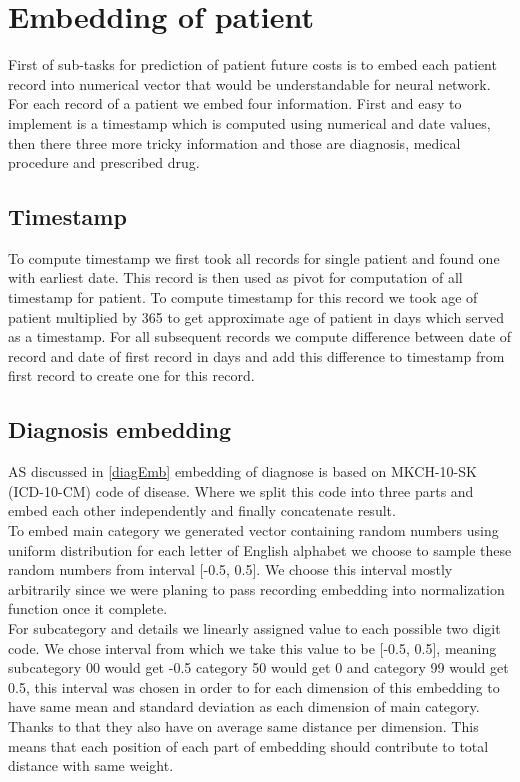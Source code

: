 
\section{Embedding of patient}
\label{embeddingImple}

First of sub-tasks for prediction of patient future costs is to embed each patient record into numerical vector that would be understandable for neural network. For each record of a patient we embed four information. First and easy to implement is a timestamp which is computed using numerical and date values, then there three more tricky information and those are diagnosis, medical procedure and prescribed drug. 

\subsection{Timestamp}

To compute timestamp we first took all records for single patient and found one with earliest date. This record is then used as pivot for computation of all timestamp for patient. To compute timestamp for this record we took age of patient multiplied by 365 to get approximate age of patient in days which served as a timestamp. For all subsequent records we compute difference between date of record and date of first record in days and add this difference to timestamp from first record to create one for this record.

\subsection{Diagnosis embedding}

AS discussed in \ref{diagEmb} embedding of diagnose is based on MKCH-10-SK (ICD-10-CM) code of disease. Where we split this code into three parts and embed each other independently and finally concatenate result.
\\

To embed main category we generated vector containing random numbers using uniform distribution for each letter of English alphabet we choose to sample these random numbers from interval [-0.5, 0.5]. We choose this interval mostly arbitrarily since we were planing to pass recording embedding into normalization function once it complete.
\\

For subcategory and details we linearly assigned value to each possible two digit code. We chose interval from which we take this value to be [-0.5, 0.5], meaning subcategory 00 would get -0.5 category 50 would get 0 and category 99 would get 0.5, this interval was chosen in order to for each dimension of this embedding to have same mean and standard deviation as each dimension of main category. Thanks to that they also have on average same distance per dimension. This means that each position of each part of embedding should contribute to total distance with same weight.
\\

